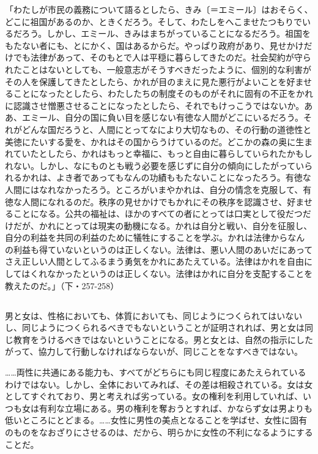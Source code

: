 「わたしが市民の義務について語るとしたら、きみ〔＝エミール〕はおそらく、どこに祖国があるのか、ときくだろう。そして、わたしをへこませたつもりでいるだろう。しかし、エミール、きみはまちがっていることになるだろう。祖国をもたない者にも、とにかく、国はあるからだ。やっぱり政府があり、見せかけだけでも法律があって、そのもとで人は平穏に暮らしてきたのだ。社会契約が守られたことはないとしても、一般意志がそうすべきだったように、個別的な利害がその人を保護してきたとしたら、かれが目のまえに見た悪行がよいことを好ませることになったとしたら、わたしたちの制度そのものがそれに固有の不正をかれに認識させ憎悪させることになったとしたら、それでもけっこうではないか。ああ、エミール、自分の国に負い目を感じない有徳な人間がどこにいるだろう。それがどんな国だろうと、人間にとってなにより大切なもの、その行動の道徳性と美徳にたいする愛を、かれはその国からうけているのだ。どこかの森の奥に生まれていたとしたら、かれはもっと幸福に、もっと自由に暮らしていられたかもしれない。しかし、なにものとも戦う必要を感じずに自分の傾向にしたがっていられるかれは、よき者であってもなんの功績ももたないことになったろう。有徳な人間にはなれなかったろう。ところがいまやかれは、自分の情念を克服して、有徳な人間になれるのだ。秩序の見せかけでもかれにその秩序を認識させ、好ませることになる。公共の福祉は、ほかのすべての者にとっては口実として役だつだけだが、かれにとっては現実の動機になる。かれは自分と戦い、自分を征服し、自分の利益を共同の利益のために犠牲にすることを学ぶ。かれは法律からなんの利益も得ていないというのは正しくない。法律は、悪い人間のあいだにあってさえ正しい人間としてふるまう勇気をかれにあたえている。法律はかれを自由にしてはくれなかったというのは正しくない。法律はかれに自分を支配することを教えたのだ。」（下・257-258）


\subsection{}

男と女は、性格においても、体質においても、同じようにつくられてはいないし、同じようにつくられるべきでもないということが証明されれば、男と女は同じ教育をうけるべきではないということになる。男と女とは、自然の指示にしたがって、協力して行動しなければならないが、同じことをなすべきではない。

……両性に共通にある能力も、すべてがどちらにも同じ程度にあたえられているわけではない。しかし、全体においてみれば、その差は相殺されている。女は女としてすぐれており、男と考えれば劣っている。女の権利を利用していれば、いつも女は有利な立場にある。男の権利を奪おうとすれば、かならず女は男よりも低いところにとどまる。……女性に男性の美点となることを学ばせ、女性に固有のものをなおざりにさせるのは、だから、明らかに女性の不利になるようにすることだ。

